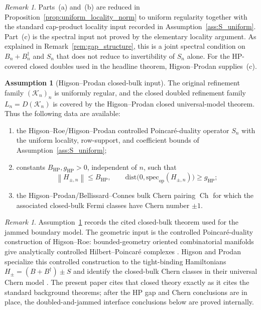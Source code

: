 \documentclass[11pt]{article}
\numberwithin{equation}{section}
\theoremstyle{definition}
\newtheorem{assumption}[theorem]{Assumption}
\theoremstyle{remark}
\newtheorem{remark}[theorem]{Remark}
\newcommand{\K}{\mathcal{K}}
\newcommand{\spec}{\mathrm{spec}}
\newcommand{\dist}{\mathrm{dist}}
\newcommand{\opnorm}[1]{\left\lVert#1\right\rVert}
\newcommand{\Ch}{\operatorname{Ch}}
\begin{document}
\begin{remark}\label{rem:assumption_status}
Parts~(a) and~(b) are reduced in Proposition~\ref{prop:uniform_locality_norm} to uniform regularity
together with the standard cap-product locality input recorded in
Assumption~\ref{ass:S_uniform}. Part~(c) is the spectral input not proved by the elementary locality
argument. As explained in Remark~\ref{rem:gap_structure}, this is a joint spectral condition on
$B_n+B_n^\dagger$ and $S_n$ that does not reduce to invertibility of $S_n$ alone. For the
HP-covered closed doubles used in the headline theorem, Higson--Prodan supplies~(c).
\end{remark}

\begin{assumption}[Higson--Prodan closed-bulk input]\label{ass:hp_admissibility}
The original refinement family $(\K_n)_n$ is uniformly regular, and the closed doubled refinement
family $L_n=D(\K_n)$ is covered by the Higson--Prodan closed universal-model theorem. Thus the
following data are available:
\begin{enumerate}[label=(\alph*),leftmargin=2em]
\item the Higson--Roe/Higson--Prodan controlled Poincar\'e-duality operator $S_n$ with the
uniform locality, row-support, and coefficient bounds of Assumption~\ref{ass:S_uniform};
\item constants $B_{\mathrm{HP}},g_{\mathrm{HP}}>0$, independent of $n$, such that
\[
\opnorm{H_{\pm,n}}\le B_{\mathrm{HP}},
\qquad
\dist\bigl(0,\spec_{\mathrm{op}}(H_{\pm,n})\bigr)\ge g_{\mathrm{HP}};
\]
\item the Higson--Prodan/Bellissard--Connes bulk Chern pairing $\Ch$ for which the associated
closed-bulk Fermi classes have Chern number $\pm1$.
\end{enumerate}
\end{assumption}

\begin{remark}\label{rem:hp_admissibility_status}
Assumption~\ref{ass:hp_admissibility} records the cited closed-bulk theorem used for the jammed
boundary model. The geometric input is the controlled Poincar\'e-duality construction of
Higson--Roe: bounded-geometry oriented combinatorial manifolds give analytically controlled
Hilbert--Poincar\'e complexes
\cite[Theorem~3.14 and Proposition~4.1]{HigsonRoeII}. Higson and Prodan specialize this
controlled construction to the tight-binding Hamiltonians $H_\pm=(B+B^\dagger)\pm S$ and identify
the closed-bulk Chern classes in their universal Chern model
\cite{HigsonProdanUniversalPRL,HigsonProdanUniversalArxiv}. The present paper cites that closed
theory exactly as it cites the standard background theorems; after the HP gap and Chern
conclusions are in place, the doubled-and-jammed interface conclusions below are proved internally.
\end{remark}
\end{document}
